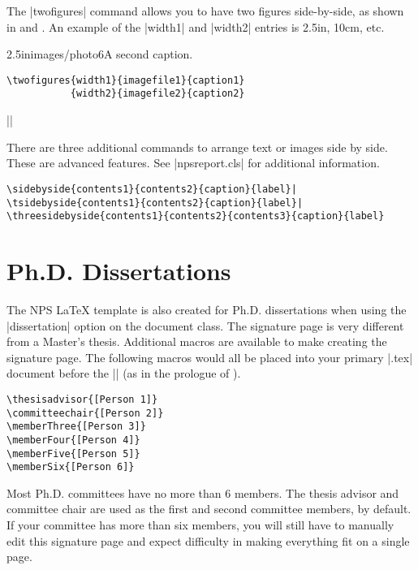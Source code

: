 The |twofigures| command allows you to have two figures side-by-side, 
as shown in  and .
An example of the |width1| and |width2| entries is 2.5in, 10cm, etc.

           {2.5in}{images/photo6}{A second caption.}

\begin{Verbatim}
\twofigures{width1}{imagefile1}{caption1}
           {width2}{imagefile2}{caption2}
\end{Verbatim}

||

There are three additional commands to arrange text or images side by side.  These are 
advanced features.  See |npsreport.cls| for additional information.

\begin{Verbatim}
\sidebyside{contents1}{contents2}{caption}{label}|
\tsidebyside{contents1}{contents2}{caption}{label}|
\threesidebyside{contents1}{contents2}{contents3}{caption}{label}
\end{Verbatim}

\section{Ph.D. Dissertations}

The NPS \LaTeX{} template is also created for Ph.D. dissertations when using the |dissertation| option on the document class.  The signature page is very different from a Master's thesis.  Additional macros are available to make creating the signature page.  The following macros would all be placed into your primary |.tex| document before the || (as in the prologue of ).

\begin{Verbatim}
\thesisadvisor{[Person 1]}
\committeechair{[Person 2]}
\memberThree{[Person 3]}
\memberFour{[Person 4]}
\memberFive{[Person 5]}
\memberSix{[Person 6]}
\end{Verbatim}

Most Ph.D. committees have no more than 6 members. The thesis advisor and committee chair are used as the first and second committee members, by default. If your committee has more than six members, you will still have to manually edit this signature page and expect difficulty in making everything fit on a single page.

